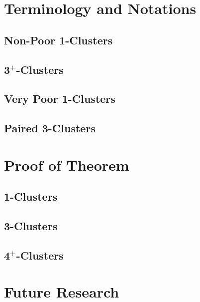 \documentclass[12pt]{report}
\numberwithin{equation}{chapter}
\theoremstyle{definition}
\theoremstyle{remark}
\begin{document}
\chapter{Terminology and Notations}


\section{Non-Poor 1-Clusters}




\section{3$^+$-Clusters}




\section{Very Poor 1-Clusters}



\section{Paired 3-Clusters}









\chapter{Proof of Theorem} \label{MainResult}




\section{1-Clusters}




\section{3-Clusters}



\section{4$^+$-Clusters}



\chapter{Future Research}
\end{document}
